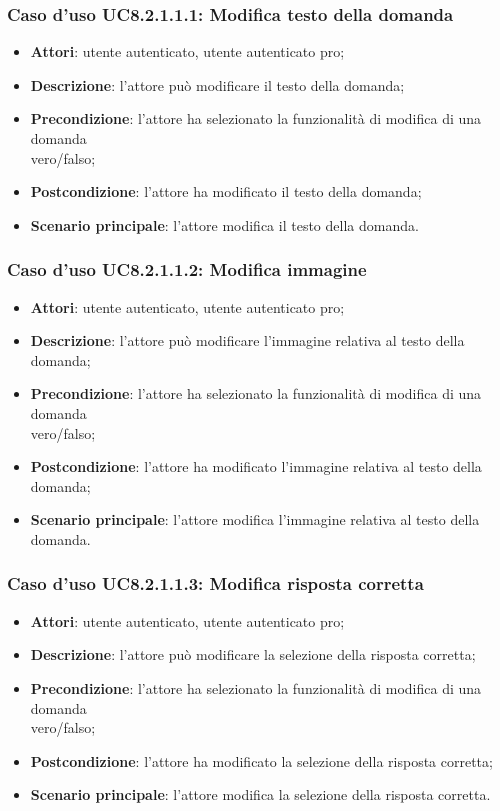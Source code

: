 \subsubsection{Caso d'uso UC8.2.1.1.1: Modifica testo della domanda}
	\begin{itemize}
		\item
			\textbf{Attori}: utente autenticato, utente autenticato pro;
		\item		
			\textbf{Descrizione}: l'attore può modificare il testo della domanda;
		\item
			\textbf{Precondizione}: l'attore ha selezionato la funzionalità di modifica di una domanda \\vero/falso; 
		\item
			\textbf{Postcondizione}: l'attore ha modificato il testo della domanda;
		\item
			\textbf{Scenario principale}: l'attore modifica il testo della domanda. 
	\end{itemize}
	
\subsubsection{Caso d'uso UC8.2.1.1.2: Modifica immagine}
	\begin{itemize}
		\item
			\textbf{Attori}: utente autenticato, utente autenticato pro;
		\item		
			\textbf{Descrizione}: l'attore può modificare l'immagine relativa al testo della domanda;
		\item
			\textbf{Precondizione}: l'attore ha selezionato la funzionalità di modifica di una domanda \\vero/falso; 
		\item
			\textbf{Postcondizione}: l'attore ha modificato l'immagine relativa al testo della domanda;
		\item
			\textbf{Scenario principale}: l'attore modifica l'immagine relativa al testo della domanda. 	
	\end{itemize}
	
\subsubsection{Caso d'uso UC8.2.1.1.3: Modifica risposta corretta}
	\begin{itemize}
		\item
			\textbf{Attori}: utente autenticato, utente autenticato pro;
		\item		
			\textbf{Descrizione}: l'attore può modificare la selezione della risposta corretta;
		\item
			\textbf{Precondizione}: l'attore ha selezionato la funzionalità di modifica di una domanda \\vero/falso; 
		\item
			\textbf{Postcondizione}: l'attore ha modificato la selezione della risposta corretta;
		\item
			\textbf{Scenario principale}: l'attore modifica la selezione della risposta corretta.	 			
	\end{itemize}
	
